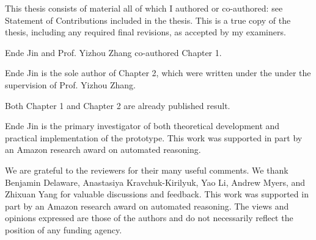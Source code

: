 





\newpage

\setcounter{page}{1}

\vspace*{\fill}


This thesis consists of material all of which I authored or co-authored: see Statement of Contributions included in the thesis. This is a true copy of the thesis, including any required final revisions, as accepted by my examiners.

\vspace*{\fill}

\newpage 


\vspace*{\fill}


Ende Jin and Prof. Yizhou Zhang co-authored Chapter 1.

Ende Jin is the sole author of Chapter 2, which were written under the  under the supervision of Prof. Yizhou Zhang.

Both Chapter 1 and Chapter 2 are already published result.

 Ende Jin is the primary investigator of both theoretical development and practical implementation of the prototype. This work was supported in part by an Amazon research award on automated
reasoning.

\vspace*{\fill}

\newpage


\vspace*{\fill}


\vspace*{\fill}


\newpage


\vspace*{\fill}

We are grateful to the reviewers for their many useful comments.  We thank
Benjamin Delaware,
Anastasiya Kravchuk-Kirilyuk, Yao Li, Andrew Myers, and Zhixuan Yang
for valuable discussions and feedback.
This work was supported in part by an Amazon research award on automated
reasoning.
The views and opinions expressed are those of the authors and do not necessarily
reflect the position of any funding agency.

